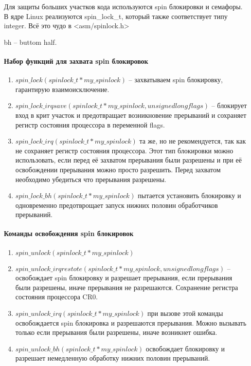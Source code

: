 Для защиты больших участков кода используются spin блокировки и семафоры. 
В ядре Linux реализуются spin\_lock\_t, который также соответствует типу integer. Всё это чудо в <asm/spinlock.h>  

bh – buttom half.

\paragraph{Набор функций для захвата spin блокировок}
\begin{enumerate}
	\item $spin\_lock(spinlock\_t *my\_spinlock)$ – захватываем spin блокировку, гарантирую взаимоисключение.
	\item $spin\_lock\_irqsave(spinlock\_t *my\_spinlock, unsigned long flags)$ – блокирует вход в крит участок и предотвращает возникновение прерываний и сохраняет регистр состояния процессора в переменной flags. 
	\item $spin\_lock\_irq(spinlock\_t *my\_spinlock)$ та же, но не рекомендуется, так как не сохраняет регистр состояния процессора. Этот тип блокировки можно использовать, если перед её захватом прерывания были разрешены и при её освобождении прерывания можно просто разрешить. Перед захватом необходимо убедиться что прерывания разрешены. 
	\item $spin\_lock\_bh(spinlock\_t *my\_spinlock)$ пытается установить блокировку и одновременно предотврощает запуск нижних половин обработчиков прерываний. 
\end{enumerate}

\paragraph{Команды освобождения spin блокировок}
\begin{enumerate}
	\item $spin\_unlock(spinlock\_t *my\_spinlock)$
	\item $spin\_unlock\_irqrestote(spinlock\_t *my\_spinlock, unsigned long flags)$ – освобождает spin блокировку и разрешает прерывания, если прерывания были разрешены, иначе прерывания не разрешаются. Сохранение регистра состояния процессора CR0. 
	\item $spin\_unlock\_irq (spinlock\_t *my\_spinlock)$ при вызове этой команды освобождается spin блокировка и разрешаются прерывания. Можно вызывать только если прерывания были разрешены, иначе возникнет ошибка.
	\item $spin\_unlock\_bh(spinlock\_t *my\_spinlock)$ освобождает блокировку и разрешает немедленную обработку нижних половин прерываний.
\end{enumerate} 

